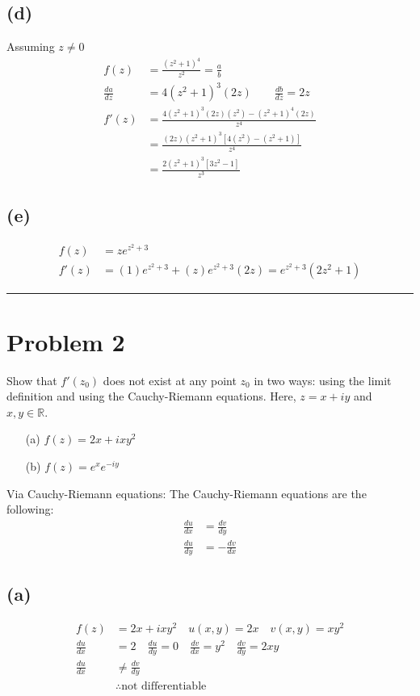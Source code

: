 \documentclass{article}
\newcommand{\der}[2]{\frac{d#1}{d#2}}
\begin{document}
\subsection*{(d)}
Assuming $z\neq 0$
\begin{align*}
	f(z)       & = \frac{(z^2+1)^4}{z^2} = \frac{a}{b}         \\
  \der{a}{z} & = 4(z^2+1)^3(2z)  \quad \quad \der{b}{z} = 2z \\
  f'(z) &= \frac{4(z^2+1)^3(2z)(z^2) - (z^2+1)^4(2z)}{z^4} \\
                   &= \frac{(2z)(z^2+1)^3[4(z^2) - (z^2+1)]}{z^4} \\
  &=\frac{2(z^2+1)^3[3z^2-1]}{z^3}
\end{align*}
\subsection*{(e)}
\begin{align*}
  f(z) &= z e^{z^2 + 3}\\
  f'(z) &= (1)e^{z^2 + 3} + (z)e^{z^2 + 3}(2z) = e^{z^2 + 3}(2z^2 + 1) 
\end{align*}

\hrule %

\newpage
\section*{Problem 2}
Show that $f'(z_0)$ does not exist at any point $z_0$ in two ways: using the limit definition and using the Cauchy-Riemann equations. Here, $z = x + iy$ and $x,y \in \mathbb{R}$.
\begin{enumerate}
	\item[(a)] $f(z) = 2x+ixy^2$
	\item[(b)] $f(z) = e^{x}e^{-iy}$
\end{enumerate}
Via Cauchy-Riemann equations:
The Cauchy-Riemann equations are the following:
\begin{align*}
	\der{u}{x} & = \der{v}{y}  \\
	\der{u}{y} & = -\der{v}{x}
\end{align*}
\subsection*{(a)}
\begin{align*}
  f(z) &= 2x+ixy^2 \quad u(x,y) = 2x \quad v(x,y) =xy^2\\
  \der{u}{x} &= 2 \quad \der{u}{y}= 0 \quad  \der{v}{x} = y^2 \quad \der{v}{y} = 2xy\\
  \der{u}{x} &\neq \der{v}{y}\\
  &\therefore \text{not differentiable}
\end{align*}
\end{document}
